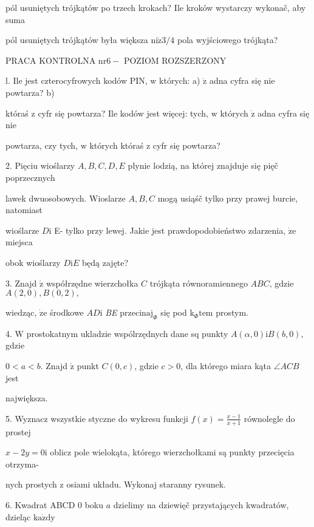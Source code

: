 \documentclass[a4paper,12pt]{article}
\begin{document}
pól usuniętych trójkątów po trzech krokach? Ile kroków wystarczy wykonač, aby suma

pól usuniętych trójkątów była większa $\mathrm{n}\mathrm{i}\dot{\mathrm{z}}3/4$ pola wyjściowego trójkąta?




PRACA KONTROLNA $\mathrm{n}\mathrm{r} 6-$ POZIOM ROZSZERZONY

l. Ile jest czterocyfrowych kodów PIN, $\mathrm{w}$ których: a) $\dot{\mathrm{z}}$ adna cyfra się nie powtarza? b)

któraś $\mathrm{z}$ cyfr się powtarza? Ile kodów jest więcej: tych, $\mathrm{w}$ których $\dot{\mathrm{z}}$ adna cyfra się nie

powtarza, czy tych, $\mathrm{w}$ których któraś $\mathrm{z}$ cyfr się powtarza?

2. Pięciu wioślarzy $A, B, C, D, E$ plynie lodzią, na której znajduje się pięč poprzecznych

lawek dwuosobowych. Wioslarze $A, B, C$ mogą usiąśč tylko przy prawej burcie, natomiast

wioślarze $D\mathrm{i}$ E- tylko przy lewej. Jakie jest prawdopodobieństwo zdarzenia, $\dot{\mathrm{z}}\mathrm{e}$ miejsca

obok wioślarzy $D\mathrm{i}E$ będą zajęte?

3. Znajd $\acute{\mathrm{z}}$ współrzędne wierzchołka $C$ trójkąta równoramiennego $ABC$, gdzie $A(2,0), B(0,2),$

wiedząc, $\dot{\mathrm{z}}\mathrm{e}$ środkowe $AD\mathrm{i}$ {\it BE} $\mathrm{p}\mathrm{r}\mathrm{z}\mathrm{e}\mathrm{c}\mathrm{i}\mathrm{n}\mathrm{a}\mathrm{j}_{\Phi}$ się pod $\mathrm{k}_{\Phi}\mathrm{t}\mathrm{e}\mathrm{m}$ prostym.

4. $\mathrm{W}$ prostokatnym ukladzie wspólrzędnych dane sq punkty $A(\alpha,0)\mathrm{i}B(b,0)$, gdzie

$0 < a < b.$ Znajd $\acute{\mathrm{z}}$ punkt $C(0,c)$, gdzie $c > 0$, dla którego miara kąta $\angle ACB$ jest

największa.

5. Wyznacz wszystkie styczne do wykresu funkcji $f(x)=\displaystyle \frac{x-1}{x+1}$ równolegle do prostej

$x-2y=0\mathrm{i}$ oblicz pole wielokąta, którego wierzchołkami są punkty przecięcia otrzyma-

nych prostych $\mathrm{z}$ osiami układu. Wykonaj staranny rysunek.

6. Kwadrat ABCD $0$ boku $a$ dzielimy na dziewięč przystających kwadratów, dzieląc $\mathrm{k}\mathrm{a}\dot{\mathrm{z}}\mathrm{d}\mathrm{y}$
\end{document}
